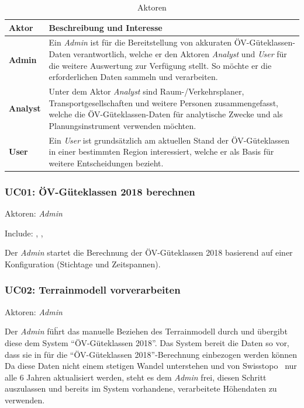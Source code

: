 \begin{table}[ht]
    \begin{tabular}{l p{14cm}}
        \toprule
        \textbf{Aktor}
                                & \textbf{Beschreibung und Interesse} \\
        \midrule
        \textbf{Admin}
                                & Ein \emph{Admin} ist für die Bereitstellung von akkuraten \acs{ÖV}-Güteklassen-Daten verantwortlich, welche er den Aktoren \emph{Analyst} und \emph{User} für die weitere Auswertung zur Verfügung stellt.
                                So möchte er die erforderlichen Daten sammeln und verarbeiten. \\
        \textbf{Analyst}
                                & Unter dem Aktor \emph{Analyst} sind Raum-/Verkehrsplaner, Transportgesellschaften und weitere Personen zusammengefasst, welche die \acs{ÖV}-Güteklassen-Daten für analytische Zwecke und als Planungsinstrument verwenden möchten. \\
        \textbf{User}
                                & Ein \emph{User} ist grundsätzlich am aktuellen Stand der \acs{ÖV}-Güteklassen in einer bestimmten Region interessiert, welche er als Basis für weitere Entscheidungen bezieht. \\
        \bottomrule
    \end{tabular}
    \caption{Aktoren}
    \label{table:Aktoren}
\end{table}

\subsubsection{UC01: ÖV-Güteklassen 2018 berechnen}
\label{Use Cases:UC01}

Aktoren: \emph{Admin}

Include: , , 

Der \emph{Admin} startet die Berechnung der \acs{ÖV}-Güteklassen 2018 basierend auf einer Konfiguration (Stichtage und Zeitspannen).


\subsubsection{UC02: Terrainmodell vorverarbeiten}
\label{Use Cases:UC02}

Aktoren: \emph{Admin}

Der \emph{Admin} füḧrt das manuelle Beziehen des \gls{Terrainmodell} durch und übergibt diese dem System "`\acs{ÖV}-Güteklassen 2018"'.
Das System bereit die Daten so vor, dass sie in  für die "`\acs{ÖV}-Güteklassen 2018"'-Berechnung einbezogen werden können
Da diese Daten nicht einem stetigen Wandel unterstehen und von Swisstopo~\cite{swissalti3d_swisstopo} nur alle 6 Jahren aktualisiert werden, steht es dem \emph{Admin} frei, diesen Schritt auszulassen und bereits im System vorhandene, verarbeitete Höhendaten zu verwenden.

